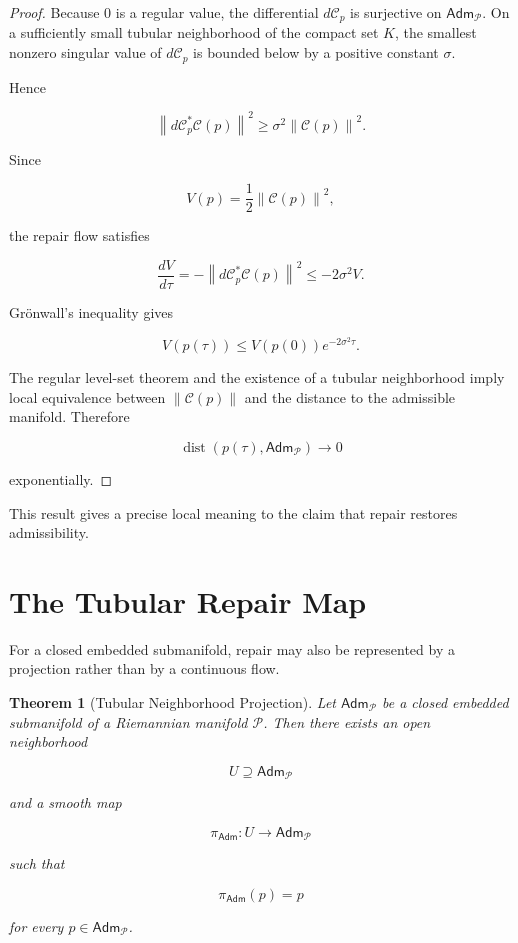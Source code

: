 \documentclass[11pt,oneside]{book}
\numberwithin{equation}{chapter}
\theoremstyle{definition}
\theoremstyle{plain}
\newtheorem{theorem}[definition]{Theorem}
\newcommand{\Adm}{\mathsf{Adm}}
\begin{document}
\begin{proof}

Because \(0\) is a regular value, the differential
\(d\mathcal C_p\) is surjective on \(\Adm_{\mathcal P}\). On a sufficiently
small tubular neighborhood of the compact set \(K\), the smallest nonzero
singular value of \(d\mathcal C_p\) is bounded below by a positive constant
\(\sigma\).

Hence

\[
\left\|
d\mathcal C_p^{*}\mathcal C(p)
\right\|^2
\geq
\sigma^2
\left\|
\mathcal C(p)
\right\|^2.
\]

Since

\[
V(p)
=
\frac12
\left\|
\mathcal C(p)
\right\|^2,
\]

the repair flow satisfies

\[
\frac{dV}{d\tau}
=
-
\left\|
d\mathcal C_p^{*}\mathcal C(p)
\right\|^2
\leq
-2\sigma^2 V.
\]

Grönwall's inequality gives

\[
V(p(\tau))
\leq
V(p(0))
e^{-2\sigma^2\tau}.
\]

The regular level-set theorem and the existence of a tubular neighborhood
imply local equivalence between
\(\|\mathcal C(p)\|\) and the distance to the admissible manifold. Therefore

\[
\operatorname{dist}
\left(
p(\tau),
\Adm_{\mathcal P}
\right)
\longrightarrow
0
\]

exponentially.

\end{proof}

This result gives a precise local meaning to the claim that repair restores
admissibility.

\section{The Tubular Repair Map}

For a closed embedded submanifold, repair may also be represented by a
projection rather than by a continuous flow.

\begin{theorem}[Tubular Neighborhood Projection]

Let \(\Adm_{\mathcal P}\) be a closed embedded submanifold of a Riemannian
manifold \(\mathcal P\). Then there exists an open neighborhood

\[
U\supseteq\Adm_{\mathcal P}
\]

and a smooth map

\[
\pi_{\Adm}:U\longrightarrow\Adm_{\mathcal P}
\]

such that

\[
\pi_{\Adm}(p)=p
\]

for every \(p\in\Adm_{\mathcal P}\).

\end{theorem}
\end{document}
